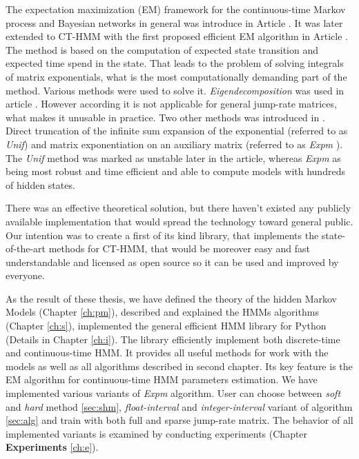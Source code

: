 \documentclass[thesis=M,english]{FITthesis}[2012/10/20]
\begin{document}
\begin{introduction}
The expectation maximization (EM) framework for the continuous-time Markov process and Bayesian networks in general was introduce in Article \cite{No12}. It was later extended to CT-HMM with the first proposed efficient EM algorithm in Article \cite{Li15}. The method is based on the computation of expected state transition and expected time spend in the state. That leads to the problem of solving integrals of matrix exponentials, what is the most computationally demanding part of the method. Various methods were used to solve it. \textit{Eigendecomposition} was used in article \cite{Wa14}. However according \cite{Li15} it is not applicable for general jump-rate matrices, what makes it unusable in practice. Two other methods was introduced in \cite{Li15}. Direct truncation of the infinite sum expansion of the exponential (referred to as \textit{Unif}) and matrix exponentiation on an auxiliary matrix (referred to as \textit{Expm} ). The \textit{Unif} method was marked as unstable later in the article, whereas \textit{Expm} as being most robust and time efficient and able to compute models with hundreds of hidden states.      

There was an effective theoretical solution, but there haven't existed any publicly available implementation that would spread the technology toward general public. Our intention was to create a first of its kind library, that implements the state-of-the-art methods for CT-HMM, that would be moreover easy and fast understandable and licensed as open source so it can be used and improved by everyone. 

As the result of these thesis, we have defined the theory of the hidden Markov Models (Chapter  \ref{ch:pm}), described and explained the HMMs algorithms (Chapter \ref{ch:s}), implemented the general efficient HMM library for Python (Details in Chapter \ref{ch:i}). The library efficiently implement both discrete-time and continuous-time HMM. It provides all useful methods for work with the models as well as all algorithms described in second chapter. Its key feature is the EM algorithm for continuous-time HMM parameters estimation. We have implemented various variants of \textit{Expm} algorithm. User can choose between \textit{soft} and \textit{hard} method \ref{sec:shm}, \textit{float-interval} and \textit{integer-interval} variant of algorithm \ref{sec:alg} and train with both full and sparse jump-rate matrix. The behavior of all implemented variants is examined by conducting  experiments (Chapter \textbf{Experiments} \ref{ch:e}).      
 	
\end{introduction}
\end{document}
